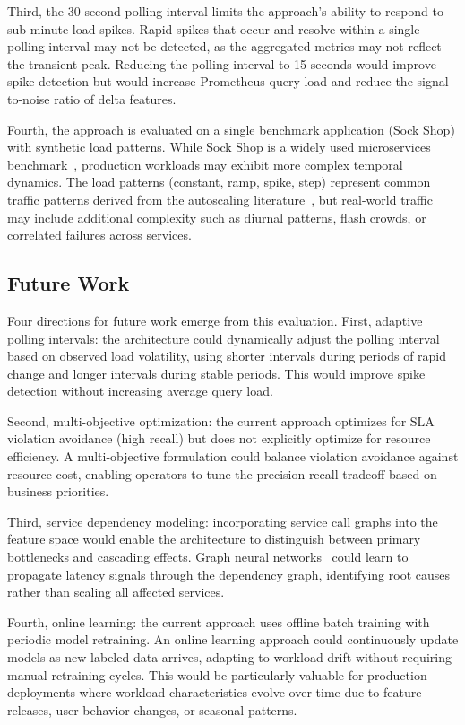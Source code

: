\documentclass[conference]{IEEEtran}
\begin{document}
Third, the 30-second polling interval limits the approach's ability to respond to sub-minute load spikes. Rapid spikes that occur and resolve within a single polling interval may not be detected, as the aggregated metrics may not reflect the transient peak. Reducing the polling interval to 15 seconds would improve spike detection but would increase Prometheus query load and reduce the signal-to-noise ratio of delta features.

Fourth, the approach is evaluated on a single benchmark application (Sock Shop) with synthetic load patterns. While Sock Shop is a widely used microservices benchmark~\cite{villamizar2017sockshop}, production workloads may exhibit more complex temporal dynamics. The load patterns (constant, ramp, spike, step) represent common traffic patterns derived from the autoscaling literature~\cite{pbscaler}, but real-world traffic may include additional complexity such as diurnal patterns, flash crowds, or correlated failures across services.

\subsection{Future Work}

Four directions for future work emerge from this evaluation. First, adaptive polling intervals: the architecture could dynamically adjust the polling interval based on observed load volatility, using shorter intervals during periods of rapid change and longer intervals during stable periods. This would improve spike detection without increasing average query load.

Second, multi-objective optimization: the current approach optimizes for SLA violation avoidance (high recall) but does not explicitly optimize for resource efficiency. A multi-objective formulation could balance violation avoidance against resource cost, enabling operators to tune the precision-recall tradeoff based on business priorities.

Third, service dependency modeling: incorporating service call graphs into the feature space would enable the architecture to distinguish between primary bottlenecks and cascading effects. Graph neural networks~\cite{gnn} could learn to propagate latency signals through the dependency graph, identifying root causes rather than scaling all affected services.

Fourth, online learning: the current approach uses offline batch training with periodic model retraining. An online learning approach could continuously update models as new labeled data arrives, adapting to workload drift without requiring manual retraining cycles. This would be particularly valuable for production deployments where workload characteristics evolve over time due to feature releases, user behavior changes, or seasonal patterns.
\end{document}
